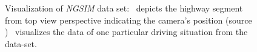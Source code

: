 \begin{figure}[t!]
	\centering
    \caption{Visualization of \emph{\ac{NGSIM}} data set:~\protect{} depicts the highway segment from top view perspective indicating the camera's position (source \cite{NGSIM-US101})~\protect{} visualizes the data of one particular driving situation from the data-set.}\label{fig:ngsim_dataset}
\end{figure}

